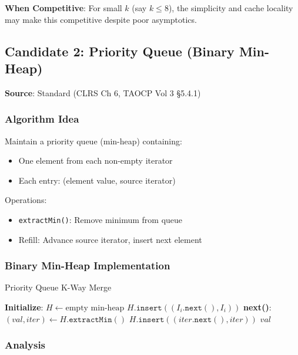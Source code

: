 \documentclass[11pt]{article}
\begin{document}
\textbf{When Competitive}: For small $k$ (say $k \leq 8$), the simplicity and cache locality may make this competitive despite poor asymptotics.

\subsection{Candidate 2: Priority Queue (Binary Min-Heap)}

\textbf{Source}: Standard (CLRS Ch 6, TAOCP Vol 3 §5.4.1)

\subsubsection{Algorithm Idea}

Maintain a priority queue (min-heap) containing:
\begin{itemize}
    \item One element from each non-empty iterator
    \item Each entry: (element value, source iterator)
\end{itemize}

Operations:
\begin{itemize}
    \item \texttt{extractMin()}: Remove minimum from queue
    \item Refill: Advance source iterator, insert next element
\end{itemize}

\subsubsection{Binary Min-Heap Implementation}

\begin{algorithm}
\caption{Priority Queue K-Way Merge}
\begin{algorithmic}[1]
\State \textbf{Initialize}:
\State $H \gets \text{empty min-heap}$
        \State $H.\texttt{insert}((I_i.\texttt{next}(), I_i))$
    \EndIf
\EndFor
\State
\State \textbf{next()}:
\State $(val, iter) \gets H.\texttt{extractMin}()$
    \State $H.\texttt{insert}((iter.\texttt{next}(), iter))$
\EndIf
\State \Return $val$
\end{algorithmic}
\end{algorithm}

\subsubsection{Analysis}
\end{document}
